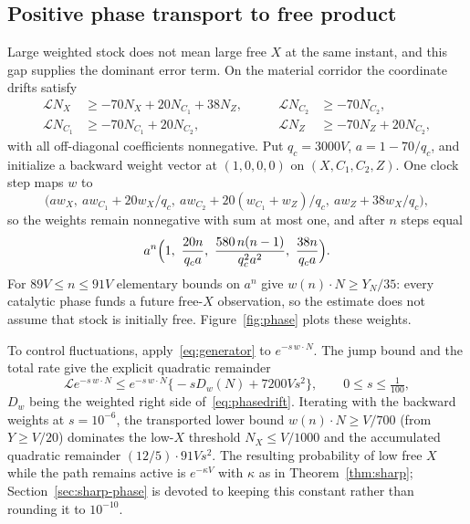\documentclass[11pt,a4paper]{article}
\theoremstyle{plain}
\theoremstyle{definition}
\theoremstyle{remark}
\newcommand{\Lgen}{\mathcal L}
\begin{document}
\subsection{Positive phase transport to free product}\label{sec:phase}

Large weighted stock does not mean large free $X$ at the same instant, and this gap supplies the dominant error term. On the material corridor the coordinate drifts satisfy
\begin{equation}\label{eq:phasedrift}
\begin{aligned}
\Lgen N_X&\ge-70N_X+20N_{C_1}+38N_Z, &\qquad \Lgen N_{C_2}&\ge-70N_{C_2},\\
\Lgen N_{C_1}&\ge-70N_{C_1}+20N_{C_2}, &\qquad \Lgen N_Z&\ge-70N_Z+20N_{C_2},
\end{aligned}
\end{equation}
with all off-diagonal coefficients nonnegative. Put $q_c=3000V$, $a=1-70/q_c$, and initialize a backward weight vector at $(1,0,0,0)$ on $(X,C_1,C_2,Z)$. One clock step maps $w$ to
\[
\bigl(aw_X,\ aw_{C_1}+20w_X/q_c,\ aw_{C_2}+20(w_{C_1}+w_Z)/q_c,\ aw_Z+38w_X/q_c\bigr),
\]
so the weights remain nonnegative with sum at most one, and after $n$ steps equal
\begin{equation}\label{eq:weights}
a^n\Bigl(1,\ \frac{20n}{q_ca},\ \frac{580\,n(n-1)}{q_c^2a^2},\ \frac{38n}{q_ca}\Bigr).
\end{equation}
For $89V\le n\le91V$ elementary bounds on $a^n$ give $w(n)\cdot N\ge Y_N/35$: every catalytic phase funds a future free-$X$ observation, so the estimate does not assume that stock is initially free. Figure~\ref{fig:phase} plots these weights.

To control fluctuations, apply~\eqref{eq:generator} to $e^{-s\,w\cdot N}$. The jump bound and the total rate give the explicit quadratic remainder
\begin{equation}\label{eq:quadratic}
\Lgen e^{-s\,w\cdot N}\le e^{-s\,w\cdot N}\bigl\{-sD_w(N)+7200Vs^2\bigr\},\qquad 0\le s\le\tfrac1{100},
\end{equation}
$D_w$ being the weighted right side of~\eqref{eq:phasedrift}. Iterating with the backward weights at $s=10^{-6}$, the transported lower bound $w(n)\cdot N\ge V/700$ (from $Y\ge V/20$) dominates the low-$X$ threshold $N_X\le V/1000$ and the accumulated quadratic remainder $(12/5)\cdot91V s^2$. The resulting probability of low free $X$ while the path remains active is $e^{-\kappa V}$ with $\kappa$ as in Theorem~\ref{thm:sharp}; Section~\ref{sec:sharp-phase} is devoted to keeping this constant rather than rounding it to $10^{-10}$.
\end{document}
